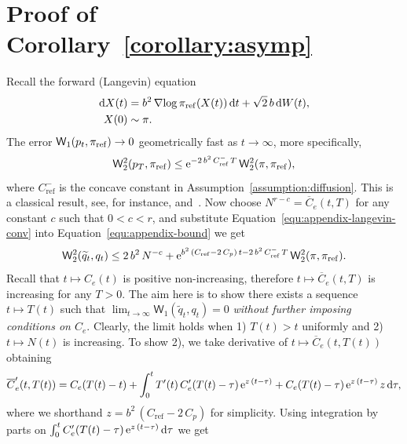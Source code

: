 \documentclass{article}
\begin{document}
\section{Proof of Corollary~\ref{corollary:asymp}}
\label{app:proof-corollary}
Recall the forward (Langevin) equation
%
\begin{equation}
	\begin{split}
		\mathop{}\!\mathrm{d} X(t) &= b^2\operatorname{\nabla\!} \log \pi_{\mathrm{ref}}(X(t)) \mathop{}\!\mathrm{d} t + \sqrt{2} \, b \mathop{}\!\mathrm{d} W(t), \\
		X(0) &\sim \pi.
	\end{split}
\end{equation}
%
The error $\mathsf{W}_1(p_t, \pi_{\mathrm{ref}}) \to 0$ geometrically fast as $t\to\infty$, more specifically, 
%
\begin{equation}
	\mathsf{W}_2^2(p_T, \pi_{\mathrm{ref}}) \leq \mathrm{e}^{-2 \,b^2 \, C_\mathrm{ref}^- \, T} \, \mathsf{W}_2^2(\pi, \pi_{\mathrm{ref}}), 
	\label{equ:appendix-langevin-conv}
\end{equation}
%
where $C_{\mathrm{ref}}^-$ is the concave constant in Assumption~\ref{assumption:diffusion}. 
This is a classical result, see, for instance, \citet{Ambrosio2008} and~\citet{VonRenesse2005}. 
Now choose $N^{r-c} = \overline{C}_e(t, T)$ for any constant $c$ such that $0<c<r$, and substitute Equation~\eqref{equ:appendix-langevin-conv} into Equation~\eqref{equ:appendix-bound} we get 
%
\begin{equation}
	\mathsf{W}_2^2(\widetilde{q}_t, q_t) \leq 2 \, b^2 \, N^{-c} + \mathrm{e}^{b^2 \,(C_{\mathrm{ref}} - 2\, C_p) \, t - 2\,b^2 \, C_\mathrm{ref}^- \, T} \, \mathsf{W}_2^2(\pi, \pi_{\mathrm{ref}}). 
\end{equation}
%
Recall that $t\mapsto C_e(t)$ is positive non-increasing, therefore $t\mapsto \overline{C}_e(t, T)$ is increasing for any $T>0$. 
The aim here is to show there exists a sequence $t\mapsto T(t)$ such that $\lim_{t\to \infty}\mathsf{W}_1(\widetilde{q}_t, q_t) = 0$ \emph{without further imposing conditions on $C_e$}. 
Clearly, the limit holds when 1) $T(t) > t$ uniformly and 2) $t \mapsto N(t)$ is increasing. 
To show 2), we take derivative of $t \mapsto \overline{C}_e(t, T(t))$ obtaining
%
\begin{equation*}
	\overline{C}_e'(t, T(t)) = C_e(T(t) - t) + \int^t_0 T'(t) \, C_e'(T(t)-\tau) \, \mathrm{e}^{z \, (t-\tau)} + C_e(T(t)-\tau) \, \mathrm{e}^{z \, (t - \tau)} \, z \mathop{}\!\mathrm{d} \tau,
\end{equation*}
%
where we shorthand $z = b^2 \, (C_\mathrm{ref} - 2 \, C_p)$ for simplicity. 
Using integration by parts on $\int^t_0 C_e'(T(t)-\tau) \, \mathrm{e}^{z \, (t-\tau)} \mathop{}\!\mathrm{d} \tau$ we get
\end{document}
